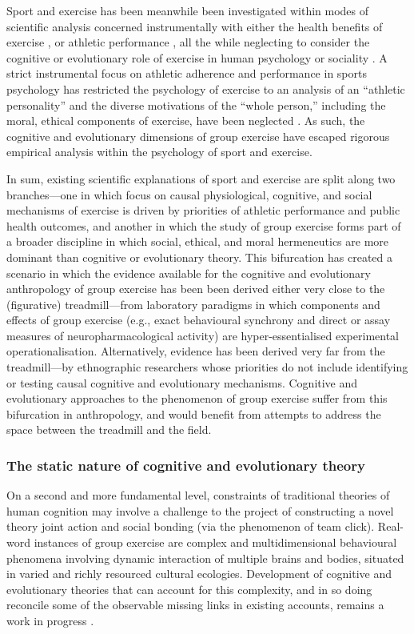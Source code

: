 \begin{CJK}{UTF8}{gbsn}
Sport and exercise has been meanwhile been investigated within modes of scientific analysis concerned instrumentally with either the health benefits of exercise \citep{Fiuza-Luces2013,Morris1994}, or athletic performance \citep{Beedie2015}, all the while neglecting to consider the cognitive or evolutionary role of exercise in human psychology or sociality \citep{Balish2013,Coulter2015}. A strict instrumental focus on athletic adherence and performance in sports psychology has restricted the psychology of exercise to an analysis of an ``athletic personality'' and the diverse motivations of the ``whole person,'' including the moral, ethical components of exercise, have been neglected \citep{Coulter2015,Laborde2014}.  As such, the cognitive and evolutionary dimensions of group exercise have escaped rigorous empirical analysis within the psychology of sport and exercise.

In sum, existing scientific explanations of sport and exercise are split along two branches---one in which focus on causal physiological, cognitive, and social mechanisms of exercise is driven by priorities of athletic performance and public health outcomes, and another in which the study of group exercise forms part of a broader discipline in which social, ethical, and moral hermeneutics are more dominant than cognitive or evolutionary theory.  This bifurcation has created a scenario in which the evidence available for the cognitive and evolutionary anthropology of group exercise has been been derived either very close to the (figurative) treadmill---from laboratory paradigms in which components and effects of group exercise (e.g., exact behavioural synchrony and direct or assay measures of neuropharmacological activity) are hyper-essentialised experimental operationalisation.  Alternatively, evidence has been derived very far from the treadmill---by ethnographic researchers whose priorities do not include identifying or testing causal cognitive and evolutionary mechanisms.  Cognitive and evolutionary approaches to the phenomenon of group exercise suffer from this bifurcation in anthropology, and would benefit from attempts to address the space between the treadmill and the field.

\subsubsection{The static nature of cognitive and evolutionary theory}
On a second and more fundamental level, constraints of traditional theories of human cognition may involve a challenge to the project of constructing a novel theory joint action and social bonding (via the phenomenon of team click).  Real-word instances of group exercise are complex and multidimensional behavioural phenomena involving dynamic interaction of multiple brains and bodies, situated in varied and richly resourced cultural ecologies.  Development of cognitive and evolutionary theories that can account for this complexity, and in so doing reconcile some of the observable missing links in existing accounts, remains a work in progress \citep{Fuentes2016}.


\end{CJK}
